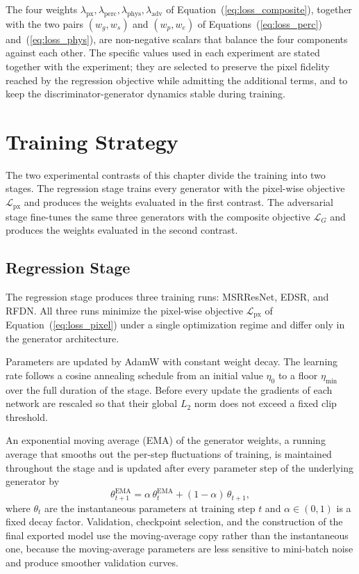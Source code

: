 The four weights $\lambda_{\mathrm{px}}, \lambda_{\mathrm{perc}}, \lambda_{\mathrm{phys}}, \lambda_{\mathrm{adv}}$ of Equation~(\ref{eq:loss_composite}), together with the two pairs $(w_{g}, w_{s})$ and $(w_{p}, w_{e})$ of Equations~(\ref{eq:loss_perc}) and~(\ref{eq:loss_phys}), are non-negative scalars that balance the four components against each other. The specific values used in each experiment are stated together with the experiment; they are selected to preserve the pixel fidelity reached by the regression objective while admitting the additional terms, and to keep the discriminator-generator dynamics stable during training.

\section{Training Strategy}
\label{sec:method_training}

The two experimental contrasts of this chapter divide the training into two stages. The regression stage trains every generator with the pixel-wise objective $\mathcal{L}_{\mathrm{px}}$ and produces the weights evaluated in the first contrast. The adversarial stage fine-tunes the same three generators with the composite objective $\mathcal{L}_G$ and produces the weights evaluated in the second contrast.


\subsection{Regression Stage}
\label{subsec:method_training_regression}

The regression stage produces three training runs: MSRResNet, EDSR, and RFDN. All three runs minimize the pixel-wise objective $\mathcal{L}_{\mathrm{px}}$ of Equation~(\ref{eq:loss_pixel}) under a single optimization regime and differ only in the generator architecture.

Parameters are updated by AdamW with constant weight decay. The learning rate follows a cosine annealing schedule from an initial value $\eta_0$ to a floor $\eta_{\min}$ over the full duration of the stage. Before every update the gradients of each network are rescaled so that their global $L_2$ norm does not exceed a fixed clip threshold.

An exponential moving average (EMA) of the generator weights, a running average that smooths out the per-step fluctuations of training, is maintained throughout the stage and is updated after every parameter step of the underlying generator by
\begin{equation}
    \theta^{\mathrm{EMA}}_{t+1} = \alpha \, \theta^{\mathrm{EMA}}_{t} + (1 - \alpha) \, \theta_{t+1},
    \label{eq:ema_update}
\end{equation}
where $\theta_t$ are the instantaneous parameters at training step $t$ and $\alpha \in (0, 1)$ is a fixed decay factor. Validation, checkpoint selection, and the construction of the final exported model use the moving-average copy rather than the instantaneous one, because the moving-average parameters are less sensitive to mini-batch noise and produce smoother validation curves.

